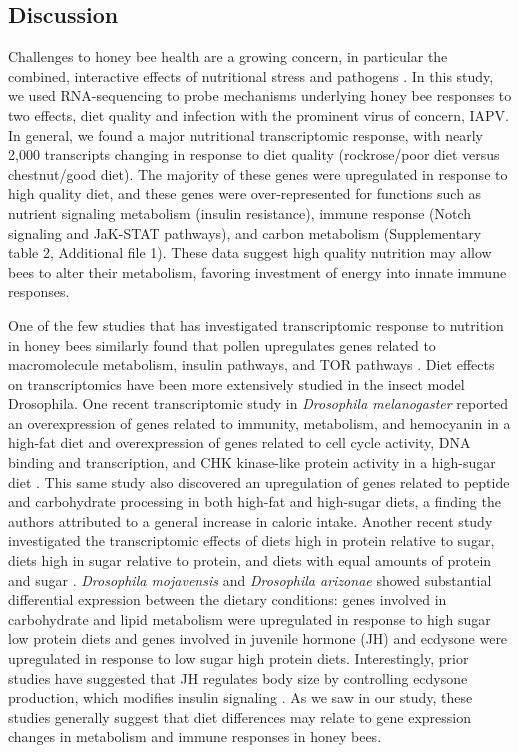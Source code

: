 \documentclass{bmcart}
\begin{document}
\begin{linenumbers}
\begin{doublespacing}
\section*{Discussion}

Challenges to honey bee health are a growing concern, in particular the combined, interactive effects of nutritional stress and pathogens \cite{AdamTothReview}. In this study, we used RNA-sequencing to probe mechanisms underlying honey bee responses to two effects, diet quality and infection with the prominent virus of concern, IAPV. In general, we found a major nutritional transcriptomic response, with nearly 2,000 transcripts changing in response to diet quality (rockrose/poor diet versus chestnut/good diet). The majority of these genes were upregulated in response to high quality diet, and these genes were over-represented for functions such as nutrient signaling metabolism (insulin resistance), immune response (Notch signaling and JaK-STAT pathways), and carbon metabolism (Supplementary table 2, Additional file 1). These data suggest high quality nutrition may allow bees to alter their metabolism, favoring investment of energy into innate immune responses.

One of the few studies that has investigated transcriptomic response to nutrition in honey bees similarly found that pollen upregulates genes related to macromolecule metabolism, insulin pathways, and TOR pathways \cite{alaux2}. Diet effects on transcriptomics have been more extensively studied in the insect model Drosophila. One recent transcriptomic study in \textit{Drosophila melanogaster} reported an overexpression of genes related to immunity, metabolism, and hemocyanin in a high-fat diet and overexpression of genes related to cell cycle activity, DNA binding and transcription, and CHK kinase-like protein activity in a high-sugar diet \cite{sugarFat}. This same study also discovered an upregulation of genes related to peptide and carbohydrate processing in both high-fat and high-sugar diets, a finding the authors attributed to a general increase in caloric intake. Another recent study investigated the transcriptomic effects of diets high in protein relative to sugar, diets high in sugar relative to protein, and diets with equal amounts of protein and sugar \cite{sugarProtein}. \textit{Drosophila mojavensis} and \textit{Drosophila arizonae} showed substantial differential expression between the dietary conditions: genes involved in carbohydrate and lipid metabolism were upregulated in response to high sugar low protein diets and genes involved in juvenile hormone (JH) and ecdysone were upregulated in response to low sugar high protein diets. Interestingly, prior studies have suggested that JH regulates body size by controlling ecdysone production, which modifies insulin signaling \cite{jHormone}. As we saw in our study, these studies generally suggest that diet differences may relate to gene expression changes in metabolism and immune responses in honey bees.


\end{doublespacing}
\end{linenumbers}
\end{document}
